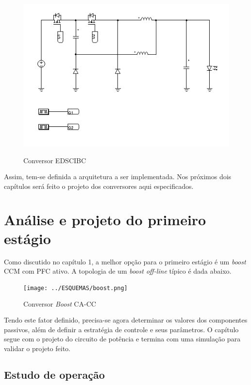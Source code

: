 \documentclass[
        12pt,
        openany, %
        oneside, %
        a4paper,			
        english,			
        brazil
        ]{abntbibufjf}
\begin{document}
\begin{figure}[!h]
	\centering
	\caption{Conversor EDSCIBC}
	\includegraphics[scale=.8]{../ESQUEMAS/_EDSCIBUCK.PNG}\\
	\label{china_1}
\end{figure}

Assim, tem-se definida a arquitetura a ser implementada. Nos próximos dois capítulos será feito o projeto dos conversores aqui especificados.



\chapter{Análise e projeto do primeiro estágio}

Como discutido no capítulo 1, a melhor opção para o primeiro estágio é um \textit{boost} CCM com PFC ativo. A topologia de um \textit{boost off-line} típico é dada abaixo.

\begin{figure}[h]
	\centering
	\caption{Conversor \textit{Boost} CA-CC}
	\texttt{[image: ../ESQUEMAS/boost.png]}\\
\end{figure}

Tendo este fator definido, precisa-se agora determinar os valores dos componentes passivos, além de definir a estratégia de controle e seus parâmetros. O capítulo segue com o projeto do circuito de potência e termina com uma simulação para validar o projeto feito.


\section{Estudo de operação}
\end{document}
